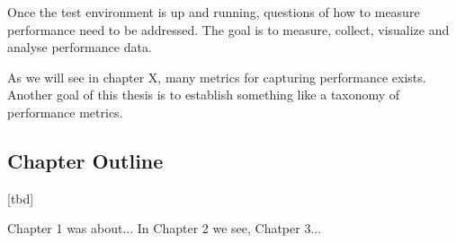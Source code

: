 Once the test environment is up and running, questions of how to measure performance need to be addressed.
The goal is to measure, collect, visualize and analyse performance data.

As we will see in chapter X, many metrics for capturing performance exists.
Another goal of this thesis is to establish something like a taxonomy of performance metrics.









\subsection{Chapter Outline}

[tbd]


Chapter 1 was about...
In Chapter 2 we see,
Chatper 3...













